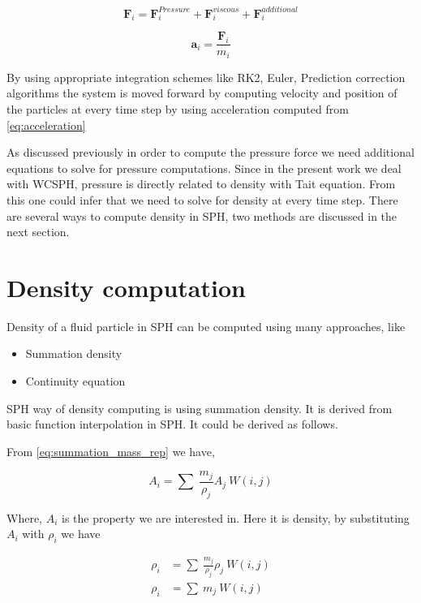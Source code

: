 \begin{equation*}
  \label{eq:total_force}
    \textbf{F}_i = \textbf{F}_{i}^{Pressure} + \textbf{F}_{i}^{viscous} + \textbf{F}_{i}^{additional}
\end{equation*}

\begin{equation}
  \label{eq:acceleration}
    \textbf{a}_i = \frac{\textbf{F}_i}{m_i}
\end{equation}

By using appropriate integration schemes like RK2, Euler, Prediction
correction algorithms the system is moved forward by computing
velocity and position of the particles at every time step by using
acceleration computed from \eqref{eq:acceleration}


As discussed previously in order to compute the pressure force we need
additional equations to solve for pressure computations. Since in the
present work we deal with WCSPH, pressure is directly related to
density with Tait equation. From this one could infer that we need to
solve for density at every time step. There are several ways to
compute density in SPH, two methods are discussed in the next section.


\section{Density computation}
\label{sec:density_comp}

Density of a fluid particle in SPH can be computed using many approaches, like

\begin{itemize}
\item Summation density
\item Continuity equation
\end{itemize}

SPH way of density computing is using summation density. It is derived from basic
function interpolation in SPH. It could be derived as follows.

From \eqref{eq:summation_mass_rep} we have,

\begin{equation*}
  \label{eq:summation_mass_rep}
  A_i = \sum\> \frac{m_j}{\rho_j} A_j\> W(i,j)
\end{equation*}

Where, $A_i$ is the property we are interested in. Here it is density,
by substituting $A_i$ with $\rho_i$ we have

\begin{align}
  \label{eq:summation_mass_rep}
    \rho_i &= \sum\> \frac{m_j}{\rho_j} \rho_j\> W(i,j) \nonumber \\
    \rho_i &= \sum\> m_j \> W(i,j)
\end{align}


